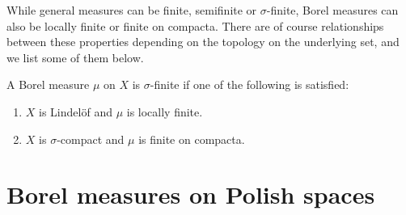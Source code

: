 \documentclass[article, a4paper, 11pt, oneside]{memoir}
\numberwithin{equation}{chapter}
\newcommand{\calB}{\mathcal{B}}
\newcommand{\borel}[1]{\calB(#1)}
\begin{document}
While general measures can be finite, semifinite or $\sigma$-finite, Borel measures can also be locally finite or finite on compacta. There are of course relationships between these properties depending on the topology on the underlying set, and we list some of them below.

\begin{proposition}
    A Borel measure $\mu$ on $X$ is $\sigma$-finite if one of the following is satisfied:
    \begin{enumerate}
        \item $X$ is Lindelöf and $\mu$ is locally finite.
        \item $X$ is $\sigma$-compact and $\mu$ is finite on compacta.
    \end{enumerate}
\end{proposition}



\section{Borel measures on Polish spaces}


\end{document}
